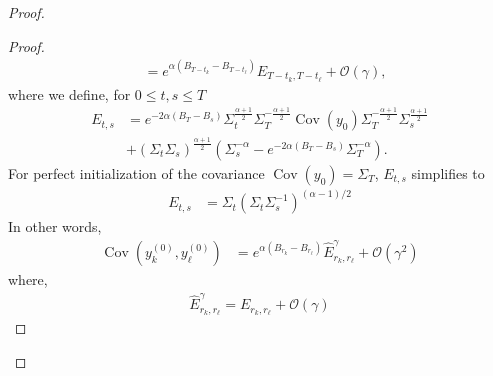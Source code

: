 \documentclass[11pt]{article}
\newcommand{\RR}{\mathbb{R}}
\newcommand{\cov}{\operatorname{Cov}}
\begin{document}
\begin{proof}
\begin{proof}
\begin{align}
&=  e^{\alpha (B_{T-t_k}-B_{T-t_\ell})} E_{T-t_k, T-t_\ell} + \mathcal{O}(\gamma),
\end{align}
where we define, for $0 \leq t,s \leq T$
\begin{equation*}
\begin{split}
    E_{t,s} &= e^{-2\alpha (B_T - B_s)}\Sigma_{t}^{\frac{\alpha+1}{2}} \Sigma_T^{-\frac{\alpha+1}{2}} \cov(y_0) \Sigma_T^{-\frac{\alpha+1}{2}}
\Sigma_{s}^{\frac{\alpha+1}{2}} \\
&+ (\Sigma_{t}\Sigma_{s})^{\frac{\alpha+1}{2}}  \left( \Sigma_{s}^{-\alpha} - e^{-2\alpha (B_T - B_s)}\Sigma_{T}^{-\alpha} \right).
\end{split}
\end{equation*}
For perfect initialization of the covariance $\cov(y_0) = \Sigma_T$, $E_{t,s}$ simplifies to
\begin{align*}
E_{t,s} &= \Sigma_{t} \left(\Sigma_{t}\Sigma_{s}^{-1}\right)^{(\alpha-1)/2}
\end{align*}
In other words,
\begin{align*}
\cov(y^{(0)}_k, y^{(0)}_\ell) &= e^{\alpha (B_{r_k}-B_{r_\ell})} \hat E^\gamma_{r_k, r_\ell} + \mathcal{O}(\gamma^2)
\end{align*}
where, %
\begin{align*}
\hat E^\gamma_{r_k, r_\ell} = E_{r_k, r_\ell} + \mathcal{O}(\gamma)
\end{align*}




\end{proof}
\end{proof}
\end{document}
